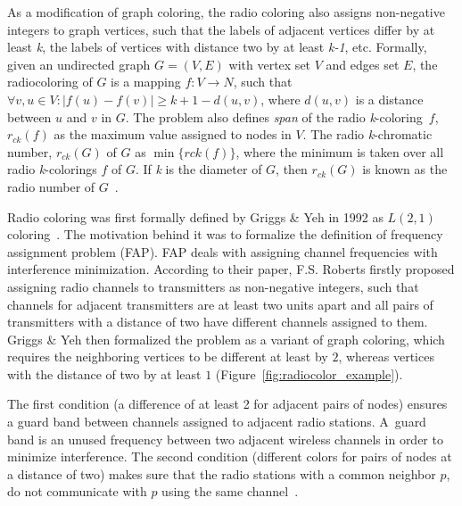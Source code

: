 \documentclass[11pt,a4paper]{article}
\begin{document}
As a modification of graph coloring, the radio coloring also assigns non-negative integers to graph vertices, such that the labels of adjacent vertices differ by at least \emph{k}, the labels of vertices with distance two by at least \emph{k-1}, etc. Formally, given an undirected graph $G = (V, E)$ with vertex set $V$ and edges set $E$, the radiocoloring of $G$ is a mapping $f: V \rightarrow N$, such that $\forall v,u \in V: |f(u) - f(v)| \geq k + 1 - d(u,v)$, where $d(u,v)$ is a distance between $u$ and $v$ in $G$. The problem also defines \emph{span} of the radio \emph{k}-coloring~$f$, $r_{ck}(f)$ as the maximum value assigned to nodes in $V$. The radio \emph{k}-chromatic number, $r_{ck}(G)$ of $G$ as $\min\{rck(f)\}$, where the minimum is taken over all radio \emph{k}-colorings $f$ of $G$. If \emph{k} is the diameter of $G$, then $r_{ck}(G)$ is known as the radio number of $G$~\cite{badr_exact_parallel_radiocolor}.

Radio coloring was first formally defined by Griggs \& Yeh in 1992 as $L(2,1)$ coloring~\cite{griggs1992_21_labeling}. The motivation behind it was to formalize the definition of frequency assignment problem (FAP). FAP deals with assigning channel frequencies with interference minimization. According to their paper, F.S. Roberts firstly proposed assigning radio channels to transmitters as non-negative integers, such that channels for adjacent transmitters are at least two units apart and all pairs of transmitters with a distance of two have different channels assigned to them. Griggs \& Yeh then formalized the problem as a variant of graph coloring, which requires the neighboring vertices to be different at least by $2$, whereas vertices with the distance of two by at least $1$ (Figure~\ref{fig:radiocolor_example}).

The first condition (a difference of at least 2 for adjacent pairs of nodes) ensures a guard band between channels assigned to adjacent radio stations. A~guard band is an unused frequency between two adjacent wireless channels in order to minimize interference. The second condition (different colors for pairs of nodes at a distance of two) makes sure that the radio stations with a common neighbor $p$,
do not communicate with $p$ using the same channel~\cite{deo2003_parallel_radiocoloring}.
\end{document}
